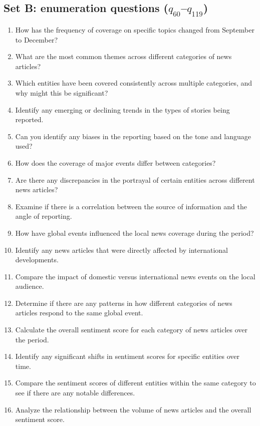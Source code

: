 \subsection{Set B: enumeration questions (\texorpdfstring{$q_{60}$--$q_{119}$}{q60-q119})}
\begin{footnotesize}
\begin{enumerate}\setlength{\itemsep}{1pt}\setcounter{enumi}{60}
\item How has the frequency of coverage on specific topics changed from September to December?
\item What are the most common themes across different categories of news articles?
\item Which entities have been covered consistently across multiple categories, and why might this be significant?
\item Identify any emerging or declining trends in the types of stories being reported.
\item Can you identify any biases in the reporting based on the tone and language used?
\item How does the coverage of major events differ between categories?
\item Are there any discrepancies in the portrayal of certain entities across different news articles?
\item Examine if there is a correlation between the source of information and the angle of reporting.
\item How have global events influenced the local news coverage during the period?
\item Identify any news articles that were directly affected by international developments.
\item Compare the impact of domestic versus international news events on the local audience.
\item Determine if there are any patterns in how different categories of news articles respond to the same global event.
\item Calculate the overall sentiment score for each category of news articles over the period.
\item Identify any significant shifts in sentiment scores for specific entities over time.
\item Compare the sentiment scores of different entities within the same category to see if there are any notable differences.
\item Analyze the relationship between the volume of news articles and the overall sentiment score.

\end{enumerate}
\end{footnotesize}
